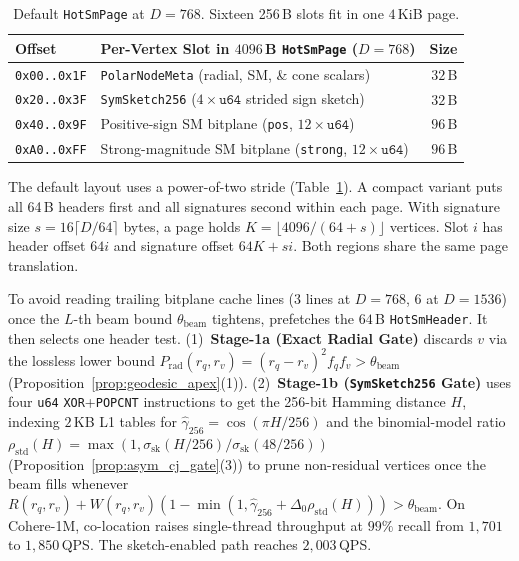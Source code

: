 \begin{table}[t]
  \centering
  \caption{Default \texttt{HotSmPage} at $D=768$. Sixteen 256\,B slots fit in one $4$\,KiB page.}
  \label{tab:hot_sm_page}
  \footnotesize
  \setlength{\tabcolsep}{4pt}
  \begin{tabularx}{\linewidth}{@{}l>{\raggedright\arraybackslash}Xr@{}}
    \toprule
    \textbf{Offset} & \textbf{Per-Vertex Slot in $4096$\,B \texttt{HotSmPage} ($D=768$)} & \textbf{Size} \\
    \midrule
    \texttt{0x00..0x1F} & \texttt{PolarNodeMeta} (radial, {SM}, \& cone scalars) & $32$\,B \\
    \texttt{0x20..0x3F} & \texttt{SymSketch256} ($4 \times \texttt{u64}$ strided sign sketch) & $32$\,B \\
    \texttt{0x40..0x9F} & Positive-sign {SM} bitplane (\texttt{pos}, $12 \times \texttt{u64}$) & $96$\,B \\
    \texttt{0xA0..0xFF} & Strong-magnitude {SM} bitplane (\texttt{strong}, $12 \times \texttt{u64}$) & $96$\,B \\
    \bottomrule
  \end{tabularx}
\end{table}

The default layout uses a power-of-two stride (Table~\ref{tab:hot_sm_page}). A compact variant puts all 64\,B headers first and all signatures second within each page. With signature size $s=16\lceil D/64\rceil$ bytes, a page holds $K=\lfloor4096/(64+s)\rfloor$ vertices. Slot $i$ has header offset $64i$ and signature offset $64K+si$. Both regions share the same page translation.

To avoid reading trailing bitplane cache lines ($3$ lines at $D=768$, $6$ at $D=1536$) once the $L$-th beam bound $\theta_{\mathrm{beam}}$ tightens, \rquiver{} prefetches the $64$\,B \texttt{HotSmHeader}. It then selects one header test.
(1)~\textbf{Stage-1a (Exact Radial Gate)} discards $v$ via the lossless lower bound $P_{\mathrm{rad}}(r_q, r_v) = (r_q - r_v)^2 f_q f_v > \theta_{\mathrm{beam}}$ (Proposition~\ref{prop:geodesic_apex}(1)).
(2)~\textbf{Stage-1b (\texttt{SymSketch256} Gate)} uses four \texttt{u64} \texttt{XOR}+\texttt{POPCNT} instructions to get the 256-bit Hamming distance $H$, indexing $2$\,KB L1 tables for $\hat{\gamma}_{256} = \cos(\pi H / 256)$ and the binomial-model ratio $\rho_{\mathrm{std}}(H) = \max(1, \sigma_{\mathrm{sk}}(H/256)/\sigma_{\mathrm{sk}}(48/256))$ (Proposition~\ref{prop:asym_cj_gate}(3)) to prune non-residual vertices once the beam fills whenever $R(r_q, r_v) + W(r_q, r_v)(1 - \min(1, \hat{\gamma}_{256} + \Delta_0\rho_{\mathrm{std}}(H))) > \theta_{\mathrm{beam}}$.
On {Cohere-1M}, co-location raises single-thread throughput at $99\%$ recall from $1{,}701$ to $1{,}850$\,QPS. The sketch-enabled path reaches $2{,}003$\,QPS.

